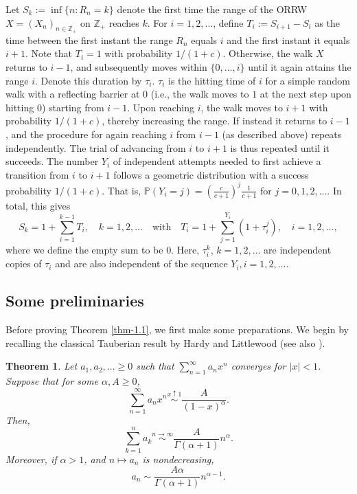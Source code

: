 \documentclass[12pt]{article}
\newtheorem{thm}{Theorem}[section]
\numberwithin{equation}{section}
\begin{document}
 Let $S_{k} := \inf \{ n: R_{n} = k \}$ denote the first time the range of the ORRW $X=(X_n)_{n\in\mathbb Z_{+}}$ on $\mathbb{Z}_{+}$ reaches $k$.  For $i=1,2,...$,
 define  $T_{i} := S_{i+1} - S_{i}$ as the time between the first instant the range  $R_{n}$ equals $i$ and the first instant it equals $i + 1$.  Note that $T_{i} = 1$ with probability $ 1/(1 + c)$.
Otherwise, the walk $X$ returns to $i-1$, and subsequently moves within $\{0,...,i\}$ until it again attains the range $i$. Denote this duration by $\tau_{i}$.
 $\tau_{i}$ is the  hitting time of  $i$ for a simple random walk with a reflecting barrier  at $0$ (i.e., the walk  moves to $1$ at the next step upon hitting 0) starting from $i-1$.
Upon reaching $i$,  the walk moves to $i+1$  with  probability $1/{(1+c)}$, thereby increasing the range.
  If instead it returns to $i-1$, and the procedure for again reaching $i$ from $i-1$  (as described above) repeats independently. The trial of advancing from $i$ to $i+1$ is thus repeated until it succeeds.
The number $Y_{i}$  of independent attempts needed to first achieve a transition from $i$ to $i+1$ follows a geometric  distribution
with  a success probability $1/(1+c)$. That is,  $\mathbb P (Y_i=j)=(\frac c{c+1})^{j}\frac 1{c+1}$ for  $j=0,1,2,...$.  In total, this gives
\begin{equation}\label{2.3}
S_{k}=1+\sum_{i=1}^{k-1}T_{i}, \quad k=1,2,\ldots \quad  \text{with}  \quad T_{i} = 1 + \sum_{j=1}^{Y_{i}} (1 + \tau_{i}^j), \quad i = 1, 2, \ldots,
\end{equation}
where we define the empty sum to be $0$. Here, $\tau_{i}^k$, $k = 1, 2, \ldots$ are  independent
copies of $\tau_i$ and are also independent of the sequence $ Y_i, i =1,2,\ldots$.


\subsection{Some preliminaries}

Before proving Theorem \ref{thm-1.1}, we first make some preparations.
We begin by recalling the classical Tauberian result by Hardy and Littlewood
\cite[Chapter I. Theorem 7.4]{T}
(see also  \cite[Proposition 12.5.2]{LGF}).

\begin{thm}\label{thm-3.1}
Let $a_{1}, a_{2}, \ldots \geq 0$ such that $\sum_{n=1}^{\infty} a_{n} x^{n}$ converges for $|x|<1$. Suppose that for some $\alpha, A \geq 0$,
\begin{equation*}
\sum_{n=1}^{\infty} a_{n} x^{n} \stackrel{x \uparrow 1}{\sim} \frac{A}{(1-x)^{\alpha}}.
\end{equation*}
Then,
\begin{equation*}
\sum_{k=1}^{n} a_{k} \stackrel{n \rightarrow \infty}{\sim} \frac{A}{\Gamma(\alpha+1)} n^{\alpha}.
\end{equation*}
Moreover, if $\alpha>1$, and $n \mapsto a_{n}$ is nondecreasing,
\begin{equation}\label{3.2-a}
a_{n} \sim \frac{A \alpha}{\Gamma(\alpha+1)} n^{\alpha-1}.
\end{equation}
\end{thm}
\end{document}
